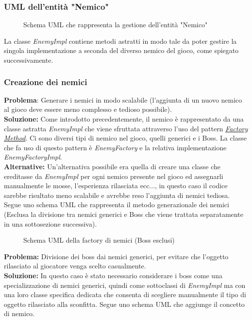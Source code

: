 \documentclass[a4paper,12pt]{report}
\begin{document}
\subsubsection{UML dell'entità "Nemico"}
\begin{figure}[H]
	\centering
	
	\caption{Schema UML che rappresenta la gestione dell'entità "Nemico"} 
	\label{fig:Schema UML dell'entità nemico}
\end{figure}
La classe \textit{EnemyImpl} contiene metodi astratti in modo tale da poter gestire la singola implementazione a seconda del diverso nemico del gioco, come spiegato successivamente.

\subsubsection{Creazione dei nemici}
\textbf{Problema}: Generare i nemici in modo scalabile (l'aggiunta di un nuovo nemico al gioco deve essere meno complesso e tedioso possibile).\\
\textbf{Soluzione:} Come introdotto precedentemente, il nemico è rappresentato da una classe astratta \textit{EnemyImpl} che viene sfruttata attraverso l'uso del pattern \href{https://refactoring.guru/design-patterns/factory-method}{\textit{Factory Method}}.
Ci sono diversi tipi di nemico nel gioco, quelli generici e i Boss. La classe che fa uso di questo pattern è \textit{EnemyFactory} e la relativa implementazione \textit{EnemyFactoryImpl}.\\ \textbf{Alternative:} Un'alternativa possibile era quella di creare una classe che ereditasse da \textit{EnemyImpl} per ogni nemico presente nel gioco ed assegnarli manualmente le mosse, l'esperienza rilasciata ecc..., in questo caso il codice sarebbe risultato meno scalabile e avrebbe reso l'aggiunta di nemici tediosa.\\
Segue uno schema UML che rappresenta il metodo generazionale dei nemici (Esclusa la divisione tra nemici generici e Boss che viene trattata separatamente in una sottosezione successiva).\\

\begin{figure}[H]
	\centering
	
	\caption{Schema UML della factory di nemici (Boss esclusi)}
	\label{fig:Schema UML della factory di nemici}
\end{figure}

\textbf{Problema:} Divisione dei boss dai nemici generici, per evitare che l'oggetto rilasciato al giocatore venga scelto casualmente.\\
\textbf{Soluzione:} In questo caso è stato necessario considerare i boss come una specializzazione di nemici generici, quindi come sottoclassi di \textit{EnemyImpl} ma con una loro classe specifica dedicata che consenta di scegliere manualmente il tipo di oggetto rilasciato alla sconfitta. Segue uno schema UML che aggiunge il concetto di nemico.\\
\end{document}
